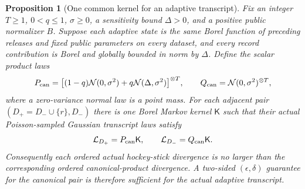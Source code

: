 \documentclass[a4paper,11pt]{article}
\newtheorem{proposition}[theorem]{Proposition}
\theoremstyle{remark}
\begin{document}
\begin{proposition}[One common kernel for an adaptive transcript]
\label{prop:canonical-kernel}
Fix an integer $T\ge1$, $0<q\le1$, $\sigma\ge0$, a sensitivity bound
$\Delta>0$, and a positive public normalizer $B$. Suppose each adaptive
state is the same Borel function of preceding releases and fixed public
parameters on every dataset,
and every record contribution is Borel and globally bounded in norm by
$\Delta$. Define the scalar product laws
\[
 P_{\rm can}=\bigl[(1-q)\mathcal N(0,\sigma^2)
                 +q\mathcal N(\Delta,\sigma^2)\bigr]^{\otimes T},
 \qquad Q_{\rm can}=\mathcal N(0,\sigma^2)^{\otimes T},
\]
where a zero-variance normal law is a point mass. For each adjacent pair
$(D_+=D_-\cup\{r\},D_-)$ there is one Borel Markov kernel $\mathsf K$
such that their actual Poisson-sampled Gaussian transcript laws satisfy
\[
 \mathcal L_{D_+}=P_{\rm can}\mathsf K,
 \qquad \mathcal L_{D_-}=Q_{\rm can}\mathsf K.
\]
Consequently each ordered actual hockey-stick divergence is no larger than
the corresponding ordered canonical-product divergence. A two-sided
$(\epsilon,\delta)$ guarantee for the canonical pair is therefore
sufficient for the actual adaptive transcript.
\end{proposition}
\end{document}
